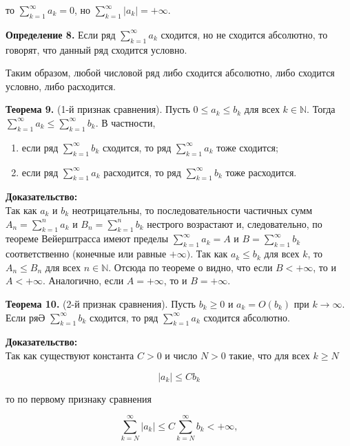\documentclass[a4paper,12pt]{article} %
\begin{document}
	то $\sum_{k=1}^{\infty} a_{k}=0$, но $\sum_{k=1}^{\infty}\left|a_{k}\right|=+\infty$.
	
	\textbf{Определение 8.} Если ряд $\sum_{k=1}^{\infty} a_{k}$ сходится, но не сходится абсолютно, то говорят, что данный ряд сходится условно.
	
	Таким образом, любой числовой ряд либо сходится абсолютно, либо сходится условно, либо расходится.
	
	\textbf{Теорема 9.} (1-й признак сравнения). Пусть $0 \leq a_{k} \leq b_{k}$ для всех $k \in \mathbb{N}$. Тогда $\sum_{k=1}^{\infty} a_{k} \leq \sum_{k=1}^{\infty} b_{k}$. В частности,
	
	\begin{enumerate}
		\item если ряд $\sum_{k=1}^{\infty} b_{k}$ сходится, то ряд $\sum_{k=1}^{\infty} a_{k}$ тоже сходится;
	
		\item если ряд $\sum_{k=1}^{\infty} a_{k}$ расходится, то ряд $\sum_{k=1}^{\infty} b_{k}$ тоже расходится.
	
	\end{enumerate}
	
	\textbf{Доказательство:\\}
	Так как $a_{k}$ и $b_{k}$ неотрицательны, то последовательности частичных сумм $A_{n}=\sum_{k=1}^{n} a_{k}$ и $B_{n}=\sum_{k=1}^{n} b_{k}$ нестрого возрастают и, следовательно, по теореме Вейерштрасса имеют пределы $\sum_{k=1}^{\infty} a_{k}=A$ и $B=\sum_{k=1}^{\infty} b_{k}$ соответственно (конечные или равные $+\infty)$. Так как $a_{k} \leq b_{k}$ для всех $k$, то $A_{n} \leq B_{n}$ для всех $n \in \mathbb{N}$. Отсюда по теореме о
	видно, что если $B<+\infty$, то и $A<+\infty$. Аналогично, если $A=+\infty$, то и $B=+\infty$.
	
	\textbf{Теорема 10.} (2-й признак сравнения). Пусть $b_{k} \geq 0$ и $a_{k}=O\left(b_{k}\right)$ при $k \rightarrow \infty$. Если ряӘ $\sum_{k=1}^{\infty} b_{k}$ сходится, то ряд $\sum_{k=1}^{\infty} a_{k}$ сходится абсолютно.
	
	\textbf{Доказательство:\\}
	Так как существуют константа $C>0$ и число $N>0$ такие, что для всех $k \geq N$
	
	$$
	\left|a_{k}\right| \leq C b_{k}
	$$
	
	то по первому признаку сравнения
	
	$$
	\sum_{k=N}^{\infty}\left|a_{k}\right| \leq C \sum_{k=N}^{\infty} b_{k}<+\infty,
	$$
	
\end{document}
